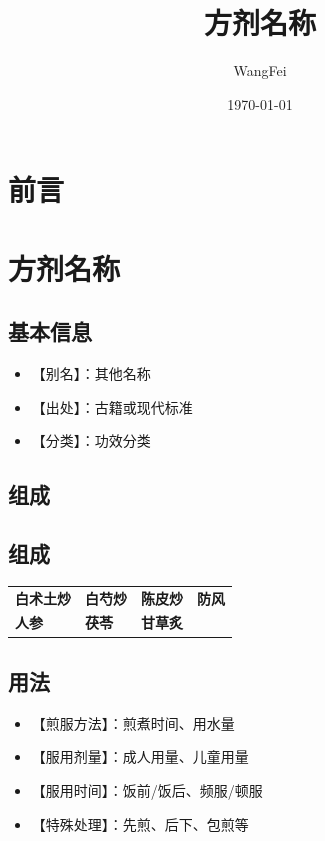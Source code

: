 \documentclass[12pt,UTF8]{ctexbook}
\title{\heiti\zihao{0} 方剂名称}
\author{WangFei}
\date{\today}
\makeatletter
\newcommand{\gujiyaowusub}[2]{\textbf{#1}\raisebox{0.3ex}{\textsubscript{\scriptsize #2}}}
\newenvironment{gujiyaowutable}[1]{%
    \section{#1}%
    \begin{center}%
    \begin{tabular}{@{}p{3.5cm}p{3.5cm}p{3.5cm}p{3.5cm}@{}}%
}{%
    \end{tabular}%
    \end{center}%
}
\makeatother
\begin{document}
\maketitle
\tableofcontents

\frontmatter
\chapter{前言}

\mainmatter

\chapter{方剂名称}

\section{基本信息}
\begin{itemize}
	\item 【别名】：其他名称
	\item 【出处】：古籍或现代标准
	\item 【分类】：功效分类
\end{itemize}

\section{组成}

\begin{gujiyaowutable}{组成}
    \gujiyaowusub{白术土炒}{三两(90g)} & \gujiyaowusub{白芍炒}{二两(60g)} & \gujiyaowusub{陈皮炒}{一两半(45g)} & \gujiyaowusub{防风}{二两(60g)} \\
    \gujiyaowusub{人参}{一两(30g)} & \gujiyaowusub{茯苓}{一两(30g)} & \gujiyaowusub{甘草炙}{五钱(15g)} & \\
\end{gujiyaowutable}

\section{用法}
\begin{itemize}
	\item 【煎服方法】：煎煮时间、用水量
	\item 【服用剂量】：成人用量、儿童用量
	\item 【服用时间】：饭前/饭后、频服/顿服
	\item 【特殊处理】：先煎、后下、包煎等
\end{itemize}
\end{document}
